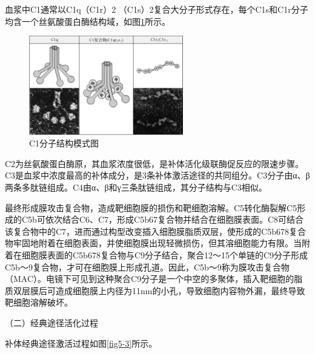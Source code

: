血浆中C1通常以C1q（C1r）2
（C1s）2复合大分子形式存在，每个C1s和C1r分子均含一个丝氨酸蛋白酶结构域，如图\ref{fig5-2}所示。

\begin{figure}[!htbp]
 \centering
 \includegraphics[width=0.6\textwidth]{./images/Image00080.jpg}
 \captionsetup{justification=centering}
 \caption{C1分子结构模式图}
 \label{fig5-2}
  \end{figure} 

C2为丝氨酸蛋白酶原，其血浆浓度很低，是补体活化级联酶促反应的限速步骤。C3是血浆中浓度最高的补体成分，是3条补体激活途径的共同组分。C3分子由α、β两条多肽链组成。C4由α、β和γ三条肽链组成，其分子结构与C3相似。

最终形成膜攻击复合物，造成靶细胞膜的损伤和靶细胞溶解。C5转化酶裂解C5形成的C5b可依次结合C6、C7，形成C5b67复合物并结合在细胞膜表面。C8可结合该复合物中的C7，进而通过构型改变插入细胞膜脂质双层，使形成的C5b678复合物牢固地附着在细胞表面，并使细胞膜出现轻微损伤，但其溶细胞能力有限。当附着在细胞膜表面的C5b678复合物与C9分子结合，聚合12～15个单链的C9分子形成C5b～9复合物，才可在细胞膜上形成孔道。因此，C5b～9称为膜攻击复合物（MAC）。电镜下可见到这种聚合C9分子是一个中空的多聚体，插入靶细胞的脂质双层膜后可造成细胞膜上内径为11nm的小孔，导致细胞内容物外漏，最终导致靶细胞溶解破坏。

（二）经典途径活化过程

补体经典途径激活过程如图\ref{fig5-3}所示。


